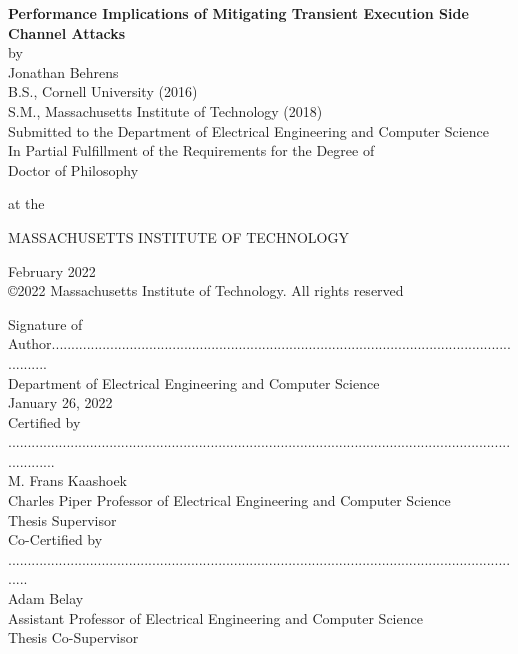 \begin{titlepage}

    \centering
    \onehalfspacing
    {\large \bf Performance Implications of Mitigating Transient Execution Side Channel Attacks} \\[1\baselineskip]
    by \\[0.25\baselineskip]
    {\large Jonathan Behrens} \\[1\baselineskip]

    B.S., Cornell University (2016) \\
    S.M., Massachusetts Institute of Technology (2018) \\[1\baselineskip]

    Submitted to the Department of Electrical Engineering and Computer Science \\
    In Partial Fulfillment of the Requirements for the Degree of\\[0.5\baselineskip]

    Doctor of Philosophy

    at the 

    MASSACHUSETTS INSTITUTE OF TECHNOLOGY

    February 2022 \\[0.5\baselineskip]

    \copyright 2022 Massachusetts Institute of Technology. All rights reserved \\[0.25in]

    \singlespacing
    \raggedleft
    \small

    Signature of Author................................................................................................................................ \\
    Department of Electrical Engineering and Computer Science \\
    January 26, 2022 \\[1\baselineskip]

    Certified by ............................................................................................................................................. \\
    M. Frans Kaashoek \\
    Charles Piper Professor of Electrical Engineering and Computer Science \\
    Thesis Supervisor \\[1\baselineskip]

    Co-Certified by ...................................................................................................................................... \\
    Adam Belay \\
    Assistant Professor of Electrical Engineering and Computer Science \\
    Thesis Co-Supervisor \\[1\baselineskip]


\end{titlepage}
